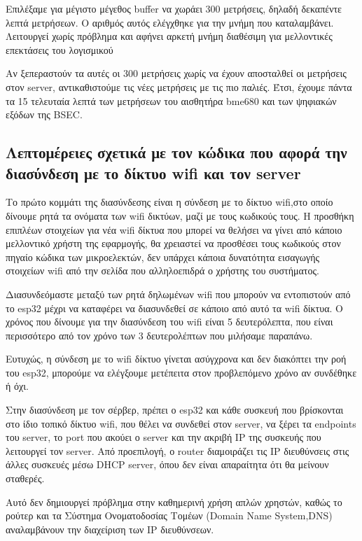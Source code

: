 Επιλέξαμε για μέγιστο μέγεθος buffer να χωράει 300 μετρήσεις, δηλαδή δεκαπέντε λεπτά μετρήσεων.
Ο αριθμός αυτός ελέγχθηκε για την μνήμη που καταλαμβάνει.
Λειτουργεί χωρίς πρόβλημα και αφήνει αρκετή μνήμη διαθέσιμη για μελλοντικές επεκτάσεις του λογισμικού 

Αν ξεπεραστούν τα αυτές οι 300 μετρήσεις χωρίς να έχουν αποσταλθεί οι μετρήσεις στον server,
αντικαθιστούμε τις νέες μετρήσεις με τις πιο παλιές. 
Έτσι, έχουμε πάντα τα 15 τελευταία λεπτά των μετρήσεων του αισθητήρα bme680 και των ψηφιακών εξόδων της BSEC.

\subsection{Λεπτομέρειες σχετικά με τον κώδικα που αφορά την διασύνδεση με το δίκτυο wifi και τον server}

Το πρώτο κομμάτι της διασύνδεσης είναι η σύνδεση με το δίκτυο wifi,στο οποίο δίνουμε ρητά τα ονόματα των wifi δικτύων,
μαζί με τους κωδικούς τους.
Η προσθήκη επιπλέων στοιχείων για νέα wifi δίκτυα που μπορεί να θελήσει να γίνει από κάποιο μελλοντικό χρήστη της εφαρμογής,
θα χρειαστεί να προσθέσει τους κωδικούς στον πηγαίο κώδικα των μικροελεκτών,  δεν υπάρχει κάποια δυνατότητα εισαγωγής στοιχείων wifi
από την σελίδα που αλληλοεπιδρά ο χρήστης του συστήματος.

Διασυνδεόμαστε μεταξύ των ρητά δηλωμένων wifi που μπορούν να εντοπιστούν από το esp32 μέχρι να καταφέρει να διασυνδεθεί 
σε κάποιο από αυτό τα wifi δίκτυα. Ο χρόνος που δίνουμε για την διασύνδεση του wifi είναι 5 δευτερόλεπτα, που είναι περισσότερο 
από τον χρόνο των 3 δευτερολέπτων που μιλήσαμε παραπάνω.

Ευτυχώς, η σύνδεση με το wifi δίκτυο γίνεται ασύγχρονα και δεν διακόπτει την ροή του esp32,
μπορούμε να ελέγξουμε μετέπειτα στον προβλεπόμενο χρόνο αν συνδέθηκε ή όχι.

Στην διασύνδεση με τον σέρβερ, πρέπει ο esp32 και κάθε συσκευή που βρίσκονται στο  ίδιο τοπικό δίκτυο wifi, που θέλει να συνδεθεί στον server, να ξέρει τα endpoints του server, το port που ακούει ο server και την ακριβή IP της συσκευής που λειτουργεί τον server.
Από προεπιλογή, ο router διαμοιράζει τις IP διευθύνσεις στις άλλες συσκευές μέσω DHCP server, όπου δεν είναι απαραίτητα ότι θα μείνουν σταθερές.

Αυτό δεν δημιουργεί πρόβλημα στην καθημερινή χρήση απλών χρηστών, καθώς το ρούτερ και τα  Σύστημα Ονοματοδοσίας Τομέων 
(Domain Name System,DNS) αναλαμβάνουν την διαχείριση των IP διευθύνσεων.

